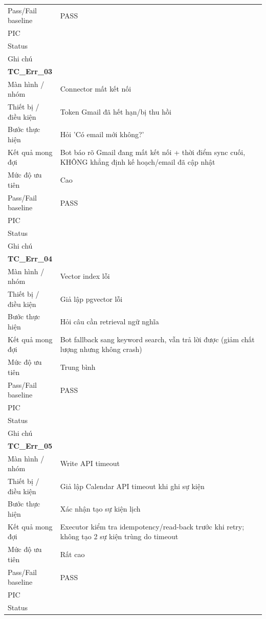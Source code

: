 \documentclass[12pt,a4paper]{article}
\begin{document}
\begin{longtable}{p{3.0cm}p{11.5cm}}
Pass/Fail baseline & PASS \\
PIC &  \\
Status &  \\
Ghi chú &  \\
\midrule
\multicolumn{2}{l}{\textbf{TC\_Err\_03}} \\
Màn hình / nhóm & Connector mất kết nối \\
Thiết bị / điều kiện & Token Gmail đã hết hạn/bị thu hồi \\
Bước thực hiện & Hỏi 'Có email mới không?' \\
Kết quả mong đợi & Bot báo rõ Gmail đang mất kết nối + thời điểm sync cuối, KHÔNG khẳng định kế hoạch/email đã cập nhật \\
Mức độ ưu tiên & Cao \\
Pass/Fail baseline & PASS \\
PIC &  \\
Status &  \\
Ghi chú &  \\
\midrule
\multicolumn{2}{l}{\textbf{TC\_Err\_04}} \\
Màn hình / nhóm & Vector index lỗi \\
Thiết bị / điều kiện & Giả lập pgvector lỗi \\
Bước thực hiện & Hỏi câu cần retrieval ngữ nghĩa \\
Kết quả mong đợi & Bot fallback sang keyword search, vẫn trả lời được (giảm chất lượng nhưng không crash) \\
Mức độ ưu tiên & Trung bình \\
Pass/Fail baseline & PASS \\
PIC &  \\
Status &  \\
Ghi chú &  \\
\midrule
\multicolumn{2}{l}{\textbf{TC\_Err\_05}} \\
Màn hình / nhóm & Write API timeout \\
Thiết bị / điều kiện & Giả lập Calendar API timeout khi ghi sự kiện \\
Bước thực hiện & Xác nhận tạo sự kiện lịch \\
Kết quả mong đợi & Executor kiểm tra idempotency/read-back trước khi retry; không tạo 2 sự kiện trùng do timeout \\
Mức độ ưu tiên & Rất cao \\
Pass/Fail baseline & PASS \\
PIC &  \\
Status &  \\

\end{longtable}
\end{document}
